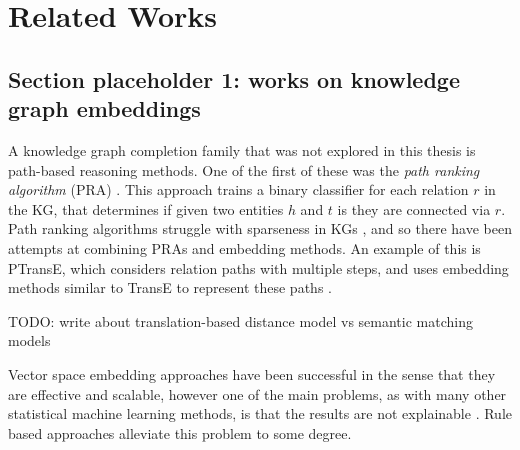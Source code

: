 \chapter{Related Works}
\section{Section placeholder 1: works on knowledge graph embeddings}
A knowledge graph completion family that was not explored in this thesis is path-based reasoning methods. One of the first of these was the \textit{path ranking algorithm} (PRA) \cite{lao2011random}. This approach trains a binary classifier for each relation $r$ in the KG, that determines if given two entities $h$ and $t$ is they are connected via $r$. Path ranking algorithms struggle with sparseness in KGs \cite{ma2019elpkg}, and so there have been attempts at combining PRAs and embedding methods. An example of this is PTransE, which considers relation paths with multiple steps, and uses embedding methods similar to TransE to represent these paths \cite{lin2015modeling}. 

TODO: write about translation-based distance model vs semantic matching models

Vector space embedding approaches have been successful in the sense that they are effective and scalable, however one of the main problems, as with many other statistical machine learning methods, is that the results are not explainable \cite{bonatti2019knowledge}. Rule based approaches alleviate this problem to some degree.

